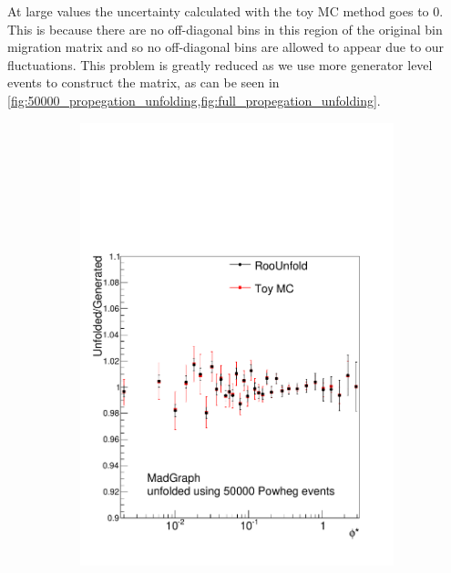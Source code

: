 At large \phistar values the uncertainty calculated with the toy MC method goes
to \num{0}. This is because there are no off-diagonal bins in this region of
the original bin migration matrix and so no off-diagonal bins are allowed to
appear due to our fluctuations. This problem is greatly reduced as we use more
generator level events to construct the matrix, as can be seen in
\cref{fig:50000_propegation_unfolding,fig:full_propegation_unfolding}.

\begin{figure}[!htbp]
    \centering
    \begin{subfigure}[b]{\SideBySidePlotWidth}
        \includegraphics[width=\textwidth]{figures/BinM_PM_50000.pdf}
        \caption{}
        \label{fig:unfolding_madgraph_with_50000}
    \end{subfigure}%
    \begin{subfigure}[b]{\SideBySidePlotWidth}

\end{subfigure}
\end{figure}
